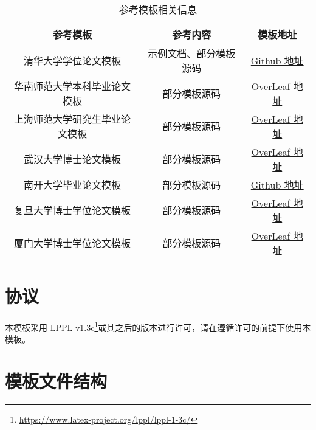 \documentclass[report,oneside,UTF8,zihao=-4]{config}
\begin{document}
\begin{table}
    \centering
    \renewcommand{\arraystretch}{1.3} %
    \setlength{\tabcolsep}{3pt} %
    \caption{参考模板相关信息}
    \label{tab:templates}
    \begin{threeparttable}[c]
        \begin{tabular}{ccc}
            \toprule[1.5pt]
            \textbf{参考模板}    &  \textbf{参考内容}    & \textbf{模板地址}\\
            \midrule[0.8pt]
            清华大学学位论文模板 & 示例文档、部分模板源码 & \href{https://github.com/tuna/thuthesis}{Github 地址}\\
            华南师范大学本科毕业论文模板 & 部分模板源码 & \href{https://www.overleaf.com/latex/templates/scnu-my-article/jkbbvhnddtsw}{OverLeaf 地址}\\
            上海师范大学研究生毕业论文模板 & 部分模板源码 & \href{https://www.overleaf.com/latex/templates/shnu-thesis/wsykzrksspgn}{OverLeaf 地址}\\
            武汉大学博士论文模板 & 部分模板源码 & \href{https://www.overleaf.com/latex/templates/wu-yi-da-xue-bo-shi-lun-wen-latex-mo-ban/rcdzgvqgkddk}{OverLeaf 地址}\\
            南开大学毕业论文模板 & 部分模板源码 & \href{https://github.com/Tr0py/NKU-thesis-template-2020}{Github 地址}\\
            复旦大学博士学位论文模板 & 部分模板源码 & \href{https://cn.overleaf.com/latex/templates/fduthesis-latex-thesis-template-for-fudan-university/svtdhhstkmkt}{OverLeaf 地址}\\
            厦门大学博士学位论文模板 & 部分模板源码 & \href{https://www.overleaf.com/latex/templates/jing-ji-xue-yuan-yu-wang-ya-nan-jing-ji-yan-jiu-yuan-lun-wen-mo-ban/wgsmpvqhhvzf}{OverLeaf 地址}\\
            \bottomrule[1.5pt]
        \end{tabular}
    \end{threeparttable}
\end{table}

\section{协议}

本模板采用 LPPL v1.3c\footnote{\url{https://www.latex-project.org/lppl/lppl-1-3c/}}或其之后的版本进行许可，请在遵循许可的前提下使用本模板。

\section{模板文件结构}
\end{document}
